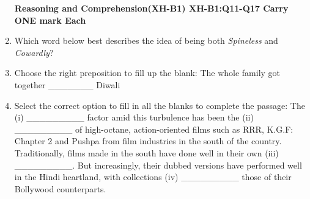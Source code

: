 \documentclass[12pt]{article}
\theoremstyle{remark}
\begin{document}
\begin{enumerate}
\begin{figure}[H]
\caption{}
\label{fig:3.3}
\end{figure}
\begin{enumerate}  \end{enumerate}
\hfill{}
\newpage
\textbf{Reasoning and Comprehension(XH-B1)\newline 
XH-B1:Q11-Q17 Carry ONE mark Each}
\item Which word below best describes the idea of being both \textit{Spineless} and \textit{Cowardly}?
\begin{enumerate}  \end{enumerate}
\hfill{}
\item Choose the right preposition to fill up the blank:
The whole family got together \_\_\_\_\_\_\_ Diwali
\begin{enumerate}  \end{enumerate}
\hfill{}
\item Select the correct option to fill in all the blanks to complete the passage:
The (i) \_\_\_\_\_\_\_\_\_ factor amid this turbulence has been the (ii) \_\_\_\_\_\_\_\_\_ of high-octane, action-oriented films such as RRR, K.G.F: Chapter 2 and Pushpa from film industries in the south of the country. Traditionally, films made in the south have done well in their own (iii) \_\_\_\_\_\_\_\_\_. But increasingly, their dubbed versions have performed well in the Hindi heartland, with collections (iv) \_\_\_\_\_\_\_\_\_ those of their Bollywood counterparts.
\begin{enumerate} 

\end{enumerate}
\end{enumerate}
\end{document}
